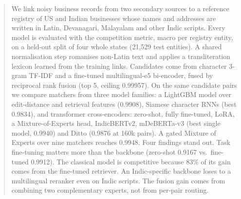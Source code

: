 \begin{abstract}
We link noisy business records from two secondary sources to a reference registry of US and Indian
businesses whose names and addresses are written in Latin, Devanagari, Malayalam and other Indic scripts.
Every model is evaluated with the competition metric, macro \fhalf{} per registry entity, on a held-out
split of four whole states (21,529 test entities). A shared normalisation step romanises non-Latin text
and applies a transliteration lexicon learned from the training links. Candidates come from character
3-gram TF-IDF and a fine-tuned multilingual-e5 bi-encoder, fused by reciprocal rank fusion (top 5,
ceiling 0.99957). On the same candidate pairs we compare matchers from three model families: a LightGBM
model over edit-distance and retrieval features (0.9908), Siamese character RNNs (best 0.9834), and
transformer cross-encoders: zero-shot, fully fine-tuned, LoRA, a Mixture-of-Experts head,
IndicBERTv2, mDeBERTa-v3 (best single model, 0.9940) and Ditto (0.9876 at 160k pairs). A gated Mixture of Experts over nine
matchers reaches 0.9948. Four findings stand out. Task fine-tuning matters more than the backbone
(zero-shot 0.9167 vs.\ fine-tuned 0.9912). The classical model is competitive because 83\% of its gain
comes from the fine-tuned retriever. An Indic-specific backbone loses to a multilingual reranker even on
Indic scripts. The fusion gain comes from combining two complementary experts, not from per-pair routing.
\end{abstract}
